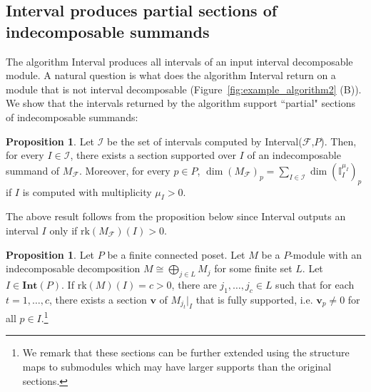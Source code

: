 \documentclass[11pt]{article}
\theoremstyle{definition}
\newtheorem{proposition}[theorem]{Proposition}
\newcommand{\bv}{\mathbf{v}}
\newcommand{\Int}{\mathbf{Int}}
\newcommand{\rk}{\mathrm{rk}}
\begin{document}
\subsection{{\sc Interval} produces partial sections of indecomposable summands}

The algorithm {\sc Interval} produces all intervals of an input interval decomposable module. A natural question is what does the algorithm {\sc Interval} return on a module that is not interval decomposable (Figure~\ref{fig:example_algorithm2} (B)). We show that the intervals returned by the algorithm support ``partial" sections of indecomposable summands:

%
\begin{proposition}
Let $\mathcal I$ be the set of intervals computed by {\sc Interval}($\mathcal F$,$P$).
Then, for every $I\in {\mathcal I}$, there exists a section supported over $I$ of an indecomposable summand of $M_{\mathcal{F}}$. Moreover, for every $p\in P$, $\dim (M_{\mathcal F})_p=\sum_{I\in {\mathcal I}} \dim(\mathbb{I}_{I}^{\mu_I})_p$ if $I$ is computed with multiplicity $\mu_I>0$.
\end{proposition}
The above result follows from the proposition below since {\sc Interval} outputs an interval $I$ only if $\rk(M_{\mathcal F})(I)> 0$. 

\begin{proposition}\label{prop:rank and section}
Let $P$ be a finite connected poset. Let $M$ be a $P$-module with an indecomposable decomposition $M\cong \bigoplus_{j\in L} M_j$ for some finite set $L$. Let $I\in \Int(P)$. If $\rk(M)(I)=c>0$, there are $j_1,\ldots,j_c\in L$ such that for each $t=1,\ldots, c$, there exists a section $\bv$ of $M_{j_t}|_I$ that is fully supported, i.e. $\bv_p\neq 0$ for all $p\in I$.\footnote{We remark that these sections can be further extended using the structure maps to submodules which may have larger supports than the original sections.}
\end{proposition}
\end{document}
